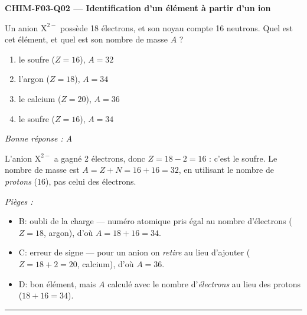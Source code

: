 \documentclass[11pt,a4paper]{article}
\begin{document}
\noindent\textbf{CHIM-F03-Q02 --- Identification d'un élément à partir d'un ion}\par
Un anion $\mathrm{X}^{2-}$ possède \num{18} électrons, et son noyau compte \num{16} neutrons. Quel est cet élément, et quel est son nombre de masse $A$ ?
\begin{enumerate}[label=\Alph*)]
\item le soufre ($Z=16$), $A=32$
\item l'argon ($Z=18$), $A=34$
\item le calcium ($Z=20$), $A=36$
\item le soufre ($Z=16$), $A=34$
\end{enumerate}
\textit{Bonne réponse : A}\par
L'anion $\mathrm{X}^{2-}$ a gagné \num{2} électrons, donc $Z = 18 - 2 = 16$ : c'est le soufre. Le nombre de masse est $A = Z + N = 16 + 16 = 32$, en utilisant le nombre de \emph{protons} ($16$), pas celui des électrons.\par
\textit{Pièges :}
\begin{itemize}
\item B: oubli de la charge --- numéro atomique pris égal au nombre d'électrons ($Z=18$, argon), d'où $A = 18+16 = 34$.
\item C: erreur de signe --- pour un anion on \emph{retire} au lieu d'ajouter ($Z = 18+2 = 20$, calcium), d'où $A=36$.
\item D: bon élément, mais $A$ calculé avec le nombre d'\emph{électrons} au lieu des protons ($18+16=34$).
\end{itemize}
\vspace{8pt}\hrule\vspace{8pt}
\end{document}
